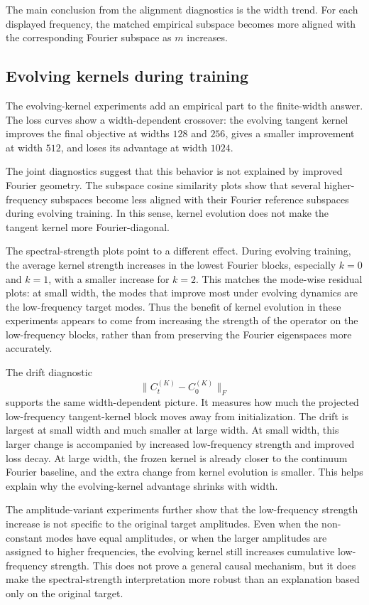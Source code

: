 The main conclusion from the alignment diagnostics is the width trend. For each
displayed frequency, the matched empirical subspace becomes more aligned with
the corresponding Fourier subspace as \(m\) increases.

\subsection{Evolving kernels during training}
\label{subsec:discussion-finite-width-evolving}

The evolving-kernel experiments add an empirical part to the finite-width
answer. The loss curves show a width-dependent crossover: the evolving tangent
kernel improves the final objective at widths \(128\) and \(256\), gives a
smaller improvement at width \(512\), and loses its advantage at width \(1024\).

The joint diagnostics suggest that this behavior is not explained by improved
Fourier geometry. The subspace cosine similarity plots show that several
higher-frequency subspaces become less aligned with their Fourier reference
subspaces during evolving training. In this sense, kernel evolution does not
make the tangent kernel more Fourier-diagonal.

The spectral-strength plots point to a different effect. During evolving
training, the average kernel strength increases in the lowest Fourier blocks,
especially \(k=0\) and \(k=1\), with a smaller increase for \(k=2\). This
matches the mode-wise residual plots: at small width, the modes that improve
most under evolving dynamics are the low-frequency target modes. Thus the
benefit of kernel evolution in these experiments appears to come from increasing
the strength of the operator on the low-frequency blocks, rather than from
preserving the Fourier eigenspaces more accurately.

The drift diagnostic
\[
	\|C_t^{(K)}-C_0^{(K)}\|_F
\]
supports the same width-dependent picture. It measures how much the projected
low-frequency tangent-kernel block moves away from initialization. The drift is
largest at small width and much smaller at large width. At small width, this
larger change is accompanied by increased low-frequency strength and improved
loss decay. At large width, the frozen kernel is already closer to the
continuum Fourier baseline, and the extra change from kernel evolution is
smaller. This helps explain why the evolving-kernel advantage shrinks with
width.

The amplitude-variant experiments further show that the low-frequency strength
increase is not specific to the original target amplitudes. Even when the
non-constant modes have equal amplitudes, or when the larger amplitudes are
assigned to higher frequencies, the evolving kernel still increases cumulative
low-frequency strength. This does not prove a general causal mechanism, but it
does make the spectral-strength interpretation more robust than an explanation
based only on the original target.

